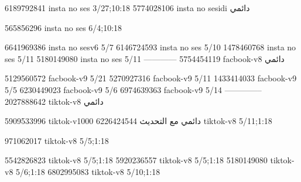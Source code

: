 
6189792841 insta no ses
3/27;10:18
5774028106 insta no sesidi
دائمي


565856296 insta no ses
6/4;10:18

6641969386 insta no sesv6
5/7
6146724593 insta no ses
5/10
1478460768 insta no ses
5/11
5180149080 insta no ses
5/11
------------
5754454119 facbook-v8
دائمي

5129560572 facbook-v9
5/21
5270927316 facbook-v9
5/11
1433414033 facbook-v9
5/5
6230449023 facbook-v9
5/6
6974639363 facbook-v9
5/14
--------------
2027888642 tiktok-v8
دائمي

5909533996 tiktok-v1000
دائمي مع التحديث
6226424544 tiktok-v8
5/11;1:18



971062017 tiktok-v8
5/5;1:18

5542826823 tiktok-v8
5/5;1:18
5920236557 tiktok-v8
5/5;1:18
5180149080 tiktok-v8
5/6;1:18
6802995083 tiktok-v8
5/10;1:18
